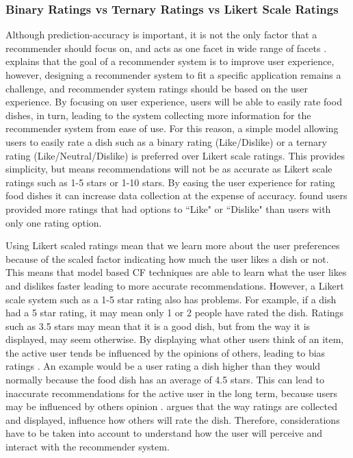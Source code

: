 \subsubsection{Binary Ratings vs Ternary Ratings vs Likert Scale Ratings}

Although prediction-accuracy is important, it is not the only factor that a recommender should focus on, and acts as one facet in wide range of facets \cite{martin2009recsys}. \citeauthor{martin2009recsys} \cite{martin2009recsys} explains that the goal of a recommender system is to improve user experience, however, designing a recommender system to fit a specific application remains a challenge, and recommender system ratings should be based on the user experience. By focusing on user experience, users will be able to easily rate food dishes, in turn, leading to the system collecting more information for the recommender system from ease of use. For this reason, a simple model allowing users to easily rate a dish such as a binary rating (Like/Dislike) or a ternary rating (Like/Neutral/Dislike) is preferred over Likert scale ratings. This provides simplicity, but means recommendations will not be as accurate as Likert scale ratings such as 1-5 stars or 1-10 stars. By easing the user experience for rating food dishes it can increase data collection at the expense of accuracy. \citeauthor{movieratings} \cite{schafer2007collaborative, movieratings} found users provided more ratings that had options to ``Like" or ``Dislike" than users with only one rating option. 

Using Likert scaled ratings mean that we learn more about the user preferences because of the scaled factor indicating how much the user likes a dish or not. This means that model based CF techniques are able to learn what the user likes and dislikes faster leading to more accurate recommendations. However, a Likert scale system such as a 1-5 star rating also has problems. For example, if a dish had a 5 star rating, it may mean only 1 or 2 people have rated the dish. Ratings such as 3.5 stars may mean that it is a good dish, but from the way it is displayed, may seem otherwise. By displaying what other users think of an item, the active user tends be influenced by the opinions of others, leading to bias ratings \cite{interface}. An example would be a user rating a dish higher than they would normally because the food dish has an average of 4.5 stars. This can lead to inaccurate recommendations for the active user in the long term, because users may be influenced by others opinion \cite{interface}. \citeauthor{interface} \cite{interface} argues that the way ratings are collected and displayed, influence how others will rate the dish. Therefore, considerations have to be taken into account to understand how the user will perceive and interact with the recommender system.  

